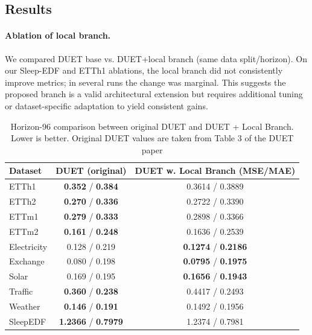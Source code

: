 \documentclass[conference]{IEEEtran}
\begin{document}
\subsection{Results}

\paragraph{Ablation of local branch.}
We compared DUET base vs. DUET+local branch (same data split/horizon).
On our Sleep-EDF and ETTh1 ablations, the local branch did not consistently improve metrics; in several runs the change was marginal.
This suggests the proposed branch is a valid architectural extension but requires additional tuning or dataset-specific adaptation to yield consistent gains.
\begin{table}[t]
\centering
\caption{Horizon-96 comparison between original DUET and DUET + Local Branch. Lower is better. Original DUET values are taken from Table 3 of the DUET paper}
\label{tab:h96_local_vs_original}
\footnotesize
\setlength{\tabcolsep}{3.5pt}
\renewcommand{\arraystretch}{0.95}
\begin{tabular}{lcc}
\toprule
Dataset & DUET (original) & DUET w. Local Branch (MSE/MAE) \\
\midrule
ETTh1 & \textbf{0.352} / \textbf{0.384} & 0.3614 / 0.3889 \\
ETTh2 & \textbf{0.270} / \textbf{0.336} & 0.2722 / 0.3390 \\
ETTm1 & \textbf{0.279} / \textbf{0.333} & 0.2898 / 0.3366 \\
ETTm2 & \textbf{0.161} / \textbf{0.248} & 0.1636 / 0.2539 \\
Electricity & 0.128 / 0.219 & \textbf{0.1274} / \textbf{0.2186} \\
Exchange & 0.080 / 0.198 & \textbf{0.0795} / \textbf{0.1975} \\
Solar & 0.169 / 0.195 & \textbf{0.1656} / \textbf{0.1943} \\
Traffic & \textbf{0.360} / \textbf{0.238} & 0.4417 / 0.2493 \\
Weather & \textbf{0.146} / \textbf{0.191} & 0.1492 / 0.1956 \\
SleepEDF & \textbf{1.2366} / \textbf{0.7979} & 1.2374 / 0.7981 \\
\bottomrule
\end{tabular}
\end{table}
\end{document}
